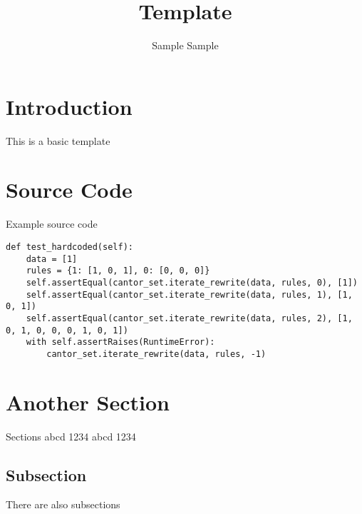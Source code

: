 \documentclass[11pt]{article}
\title{Template}
\author{Sample Sample}
\begin{document}
\maketitle

\tableofcontents

\pagebreak

\section{Introduction}
This is a basic template

\section{Source Code}
Example source code

\begin{lstlisting}
def test_hardcoded(self):
    data = [1]
    rules = {1: [1, 0, 1], 0: [0, 0, 0]}
    self.assertEqual(cantor_set.iterate_rewrite(data, rules, 0), [1])
    self.assertEqual(cantor_set.iterate_rewrite(data, rules, 1), [1, 0, 1])
    self.assertEqual(cantor_set.iterate_rewrite(data, rules, 2), [1, 0, 1, 0, 0, 0, 1, 0, 1])
    with self.assertRaises(RuntimeError):
        cantor_set.iterate_rewrite(data, rules, -1)
\end{lstlisting}

\section{Another Section}
Sections abcd 1234 abcd 1234

\subsection{Subsection}
There are also subsections
\end{document}
